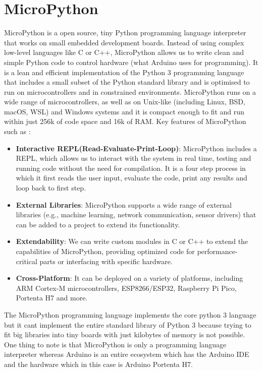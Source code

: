 \section{MicroPython}
MicroPython is a open source, tiny Python programming language interpreter that works on small embedded development boards. Instead of using complex low-level languages like C or C++, MicroPython allows us to write clean and simple Python code to control hardware (what Arduino uses for programming). It is a lean and efficient implementation of the Python 3 programming language that includes a small subset of the Python standard library and is optimised to run on microcontrollers and in constrained environments.
MicroPython runs on a wide range of microcontrollers, as well as on Unix-like (including Linux, BSD, macOS, WSL) and Windows systems and it is compact enough to fit and run within just 256k of code space and 16k of RAM. \cite{micropython_github:2024} \cite{micropython_official:2024}
Key features of MicroPython such as :
\begin{itemize}
	\item \textbf{Interactive REPL(Read-Evaluate-Print-Loop)}: MicroPython includes a REPL, which allows us to interact with the system in real time, testing and running code without the need for compilation. It is a four step process in which it first reads the user input, evaluate the code, print any results and loop back to first step.
	\item \textbf{External Libraries}: MicroPython supports a wide range of external libraries (e.g., machine learning, network communication, sensor drivers) that can be added to a project to extend its functionality.
	\item \textbf{Extendability}: We can write custom modules in C or C++ to extend the capabilities of MicroPython, providing optimized code for performance-critical parts or interfacing with specific hardware.
	\item \textbf{Cross-Platform}: It can be deployed on a variety of platforms, including ARM Cortex-M microcontrollers, ESP8266/ESP32, Raspberry Pi Pico, Portenta H7 and more.
\end{itemize}

The MicroPython programming language implements the core python 3 language but it cant implement the entire standard library of Python 3 because trying to fit big libraries into tiny boards with just kilobytes of memory is not possible. One thing to
note is that MicroPython is only a programming language interpreter whereas Arduino is an entire ecosystem which has the Arduino IDE and the hardware which in this case is Arduino Portenta H7.

